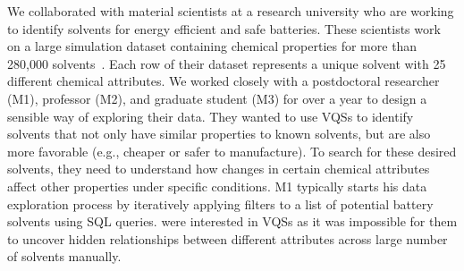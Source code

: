 \par\noindent{} We collaborated with material scientists at a research university who are working to identify solvents for energy efficient and safe batteries. These scientists work on a large simulation dataset containing chemical properties for more than 280,000 solvents~\cite{Khetan2018}. Each row of their dataset represents a unique solvent with 25 different chemical attributes. We worked closely with a postdoctoral researcher (M1), professor (M2), and graduate student (M3) for over a year to design a sensible way of exploring their data. They wanted to use VQSs to identify solvents that not only have similar properties to known solvents, but are also more favorable (e.g., cheaper or safer to manufacture). To search for these desired solvents, they need to understand how changes in certain chemical attributes affect other properties under specific conditions.
\npar M1 typically starts his data exploration process by iteratively applying filters to a list of potential battery solvents using SQL queries.  were interested in VQSs as it was impossible for them to uncover hidden relationships between different attributes across large number of solvents manually.%
